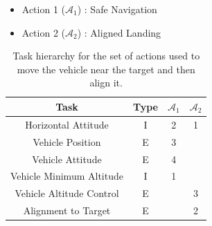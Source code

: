 \documentclass{article}
\begin{document}
\begin{table}[htb]
	\caption{Task hierarchy for the set of actions used to move the vehicle near the target and then align it.}
	\begin{itemize}
		\item Action 1 ($\mathcal{A}_{1}$) : Safe Navigation
		\item Action 2 ($\mathcal{A}_{2}$) : Aligned Landing
	\end{itemize}
	\label{tb_align2:actions_table}
	\begin{center}
		\footnotesize
		\begin{tabular}{cccc}
			\toprule
			Task & Type & $\mathcal{A}_{1}$ & $\mathcal{A}_{2}$ \\
			\midrule
			Horizontal Attitude             & I & 2 & 1 \\
			\hdashline
			Vehicle Position				& E & 3 &   \\
			\hdashline
			Vehicle Attitude                & E & 4 &   \\
			\hdashline
			Vehicle Minimum Altitude        & I & 1 &   \\
			\hdashline
			Vehicle Altitude Control        & E &   & 3 \\
			\hdashline
			Alignment to Target             & E &   & 2 \\
			
			\bottomrule
		\end{tabular}
	\end{center}
\end{table}%
\end{document}
